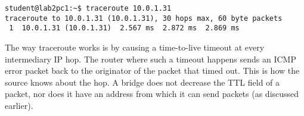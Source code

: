 \begin{lstlisting}
student@lab2pc1:~$ traceroute 10.0.1.31
traceroute to 10.0.1.31 (10.0.1.31), 30 hops max, 60 byte packets
 1  10.0.1.31 (10.0.1.31)  2.567 ms  2.872 ms  2.869 ms
\end{lstlisting}

The way traceroute works is by causing a time-to-live timeout at every intermediary IP hop. The
router where such a timeout happens sends an ICMP error packet back to the originator of the
packet that timed out. This is how the source knows about the hop. A bridge does not decrease
the TTL field of a packet, nor does it have an address from which it can send packets (as
discussed earlier).
